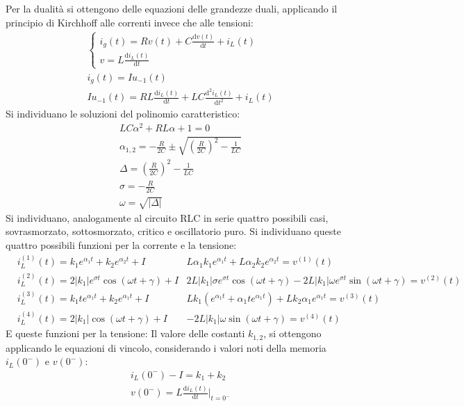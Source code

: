 \documentclass{article}
\newcommand{\df}{\mathrm{d}}
\numberwithin{equation}{subsection}
\begin{document}
Per la dualità si ottengono delle equazioni delle grandezze duali, applicando il principio di Kirchhoff alle correnti invece che alle tensioni:
\begin{gather*}
    \begin{cases}
        i_g(t)=Rv(t)+C\displaystyle\frac{\df v(t)}{\df t}+i_L(t)\\
        v=\displaystyle L\frac{\df i_L(t)}{\df t}
    \end{cases}\\
    i_g(t)=Iu_{-1}(t)\\
    Iu_{-1}(t)=RL\displaystyle\frac{\df i_L(t)}{\df t}+LC\frac{\df^2i_L(t)}{\df t^2}+i_L(t)
\end{gather*}
Si individuano le soluzioni del polinomio caratteristico:
\begin{gather*}
    LC\alpha^2+RL\alpha+1=0\\
    \alpha_{1,2}=-\displaystyle\frac{R}{2C}\pm\sqrt{\left(\frac{R}{2C}\right)^2-\frac{1}{LC}}\\
    \Delta=\displaystyle\left(\frac{R}{2C}\right)^2-\frac{1}{LC}\\
    \sigma=\displaystyle-\frac{R}{2C}\\
    \omega=\sqrt{|\Delta|}
\end{gather*}
Si individuano, analogamente al circuito RLC in serie quattro possibili casi, sovrasmorzato, sottosmorzato, critico e oscillatorio puro. Si individuano queste quattro 
possibili funzioni per la corrente e la tensione: 
\begin{align*}
    &i_L^{(1)}(t)=k_1e^{\alpha_1t}+k_2e^{\alpha_2t}+I    &L\alpha_1k_1e^{\alpha_1t}+L\alpha_2k_2e^{\alpha_2t}=v^{(1)}(t)\\
    &i_L^{(2)}(t)=2|k_1|e^{\sigma t}\cos(\omega t+\gamma)+I    &2L|k_1|\sigma e^{\sigma t}\cos(\omega t+\gamma)-2L|k_1|\omega e^{\sigma t}\sin(\omega t+\gamma)=v^{(2)}(t)\\
    &i_L^{(3)}(t)=k_1te^{\alpha_1t}+k_2e^{\alpha_1t}+I    &Lk_1(e^{\alpha_1t}+\alpha_1te^{\alpha_1t})+Lk_2\alpha_1e^{\alpha_1t}=v^{(3)}(t)\\
    &i_L^{(4)}(t)=2|k_1|\cos(\omega t+\gamma)+I    &-2L|k_1|\omega\sin(\omega t+\gamma)=v^{(4)}(t)
\end{align*}
E queste funzioni per la tensione:
Il valore delle costanti $k_{1,2}$, si ottengono applicando le equazioni di vincolo, considerando i valori noti della memoria $i_L(0^-)$ e $v(0^-)$:
\begin{gather*}
    i_L(0^-)-I=k_1+k_2\\
    v(0^-)=L\displaystyle\frac{\df i_L(t)}{\df t}\bigg|_{t={0^-}}
\end{gather*}
\end{document}
